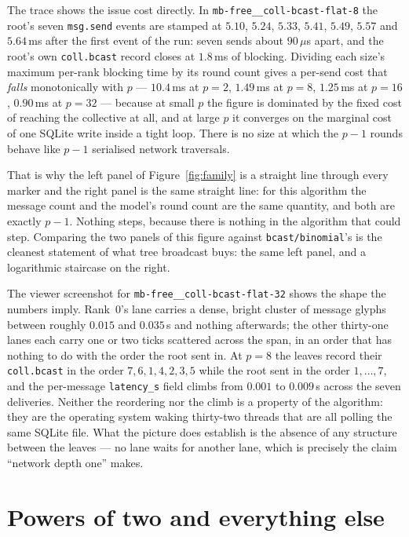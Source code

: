 \documentclass[11pt]{article}
\begin{document}
The trace shows the issue cost directly. In \texttt{mb-free\_\_coll-bcast-flat-8} the root's
seven \texttt{msg.send} events are stamped at $5.10$, $5.24$, $5.33$, $5.41$, $5.49$, $5.57$
and $5.64$\,ms after the first event of the run: seven sends about $90\,\mu$s apart, and the
root's own \texttt{coll.bcast} record closes at $1.8$\,ms of blocking. Dividing each size's
maximum per-rank blocking time by its round count gives a per-send cost that \emph{falls}
monotonically with $p$ --- $10.4$\,ms at $p=2$, $1.49$\,ms at $p=8$, $1.25$\,ms at $p=16$,
$0.90$\,ms at $p=32$ --- because at small $p$ the figure is dominated by the fixed cost of
reaching the collective at all, and at large $p$ it converges on the marginal cost of one
SQLite write inside a tight loop. There is no size at which the $p-1$ rounds behave like
$p-1$ serialised network traversals.

That is why the left panel of Figure~\ref{fig:family} is a straight line through every marker
and the right panel is the same straight line: for this algorithm the message count and the
model's round count are the same quantity, and both are exactly $p-1$. Nothing steps, because
there is nothing in the algorithm that could step. Comparing the two panels of this figure
against \texttt{bcast/binomial}'s is the cleanest statement of what tree broadcast buys: the
same left panel, and a logarithmic staircase on the right.

The viewer screenshot for \texttt{mb-free\_\_coll-bcast-flat-32} shows the shape the numbers
imply. Rank~0's lane carries a dense, bright cluster of message glyphs between roughly
$0.015$ and $0.035$\,s and nothing afterwards; the other thirty-one lanes each carry one or
two ticks scattered across the span, in an order that has nothing to do with the order the
root sent in. At $p=8$ the leaves record their \texttt{coll.bcast} in the order
$7, 6, 1, 4, 2, 3, 5$ while the root sent in the order $1,\dots,7$, and the per-message
\texttt{latency\_s} field climbs from $0.001$ to $0.009$\,s across the seven deliveries.
Neither the reordering nor the climb is a property of the algorithm: they are the operating
system waking thirty-two threads that are all polling the same SQLite file. What the picture
does establish is the absence of any structure between the leaves --- no lane waits for
another lane, which is precisely the claim ``network depth one'' makes.

\section{Powers of two and everything else}
\end{document}
